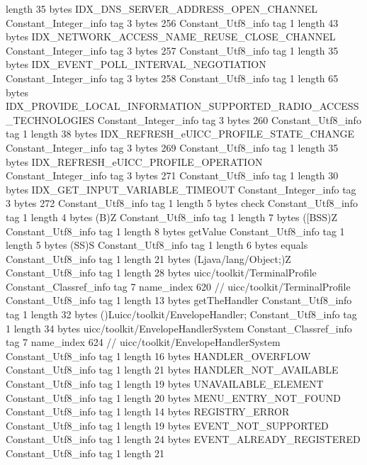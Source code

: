 {{{			length	35
			bytes	IDX_DNS_SERVER_ADDRESS_OPEN_CHANNEL
		}
		Constant_Integer_info {
			tag	3
			bytes	256
		}
		Constant_Utf8_info {
			tag	1
			length	43
			bytes	IDX_NETWORK_ACCESS_NAME_REUSE_CLOSE_CHANNEL
		}
		Constant_Integer_info {
			tag	3
			bytes	257
		}
		Constant_Utf8_info {
			tag	1
			length	35
			bytes	IDX_EVENT_POLL_INTERVAL_NEGOTIATION
		}
		Constant_Integer_info {
			tag	3
			bytes	258
		}
		Constant_Utf8_info {
			tag	1
			length	65
			bytes	IDX_PROVIDE_LOCAL_INFORMATION_SUPPORTED_RADIO_ACCESS_TECHNOLOGIES
		}
		Constant_Integer_info {
			tag	3
			bytes	260
		}
		Constant_Utf8_info {
			tag	1
			length	38
			bytes	IDX_REFRESH_eUICC_PROFILE_STATE_CHANGE
		}
		Constant_Integer_info {
			tag	3
			bytes	269
		}
		Constant_Utf8_info {
			tag	1
			length	35
			bytes	IDX_REFRESH_eUICC_PROFILE_OPERATION
		}
		Constant_Integer_info {
			tag	3
			bytes	271
		}
		Constant_Utf8_info {
			tag	1
			length	30
			bytes	IDX_GET_INPUT_VARIABLE_TIMEOUT
		}
		Constant_Integer_info {
			tag	3
			bytes	272
		}
		Constant_Utf8_info {
			tag	1
			length	5
			bytes	check
		}
		Constant_Utf8_info {
			tag	1
			length	4
			bytes	(B)Z
		}
		Constant_Utf8_info {
			tag	1
			length	7
			bytes	([BSS)Z
		}
		Constant_Utf8_info {
			tag	1
			length	8
			bytes	getValue
		}
		Constant_Utf8_info {
			tag	1
			length	5
			bytes	(SS)S
		}
		Constant_Utf8_info {
			tag	1
			length	6
			bytes	equals
		}
		Constant_Utf8_info {
			tag	1
			length	21
			bytes	(Ljava/lang/Object;)Z
		}
		Constant_Utf8_info {
			tag	1
			length	28
			bytes	uicc/toolkit/TerminalProfile
		}
		Constant_Classref_info {
			tag	7
			name_index	620		// uicc/toolkit/TerminalProfile
		}
		Constant_Utf8_info {
			tag	1
			length	13
			bytes	getTheHandler
		}
		Constant_Utf8_info {
			tag	1
			length	32
			bytes	()Luicc/toolkit/EnvelopeHandler;
		}
		Constant_Utf8_info {
			tag	1
			length	34
			bytes	uicc/toolkit/EnvelopeHandlerSystem
		}
		Constant_Classref_info {
			tag	7
			name_index	624		// uicc/toolkit/EnvelopeHandlerSystem
		}
		Constant_Utf8_info {
			tag	1
			length	16
			bytes	HANDLER_OVERFLOW
		}
		Constant_Utf8_info {
			tag	1
			length	21
			bytes	HANDLER_NOT_AVAILABLE
		}
		Constant_Utf8_info {
			tag	1
			length	19
			bytes	UNAVAILABLE_ELEMENT
		}
		Constant_Utf8_info {
			tag	1
			length	20
			bytes	MENU_ENTRY_NOT_FOUND
		}
		Constant_Utf8_info {
			tag	1
			length	14
			bytes	REGISTRY_ERROR
		}
		Constant_Utf8_info {
			tag	1
			length	19
			bytes	EVENT_NOT_SUPPORTED
		}
		Constant_Utf8_info {
			tag	1
			length	24
			bytes	EVENT_ALREADY_REGISTERED
		}
		Constant_Utf8_info {
			tag	1
			length	21
}}}
